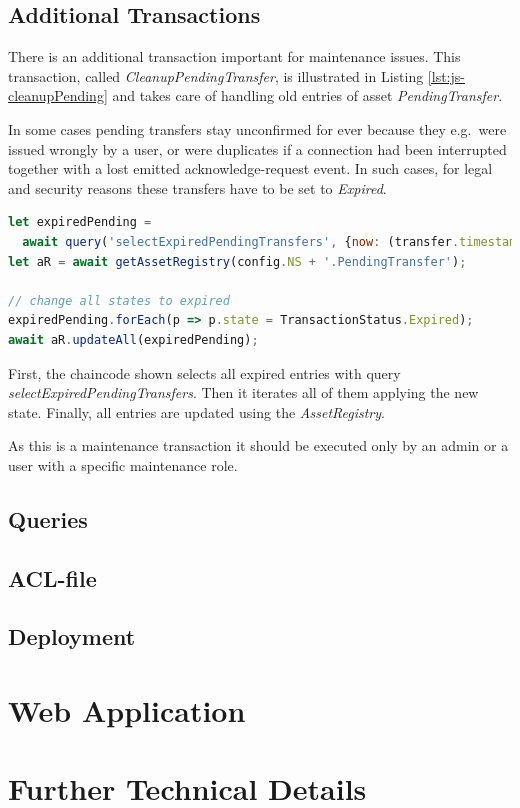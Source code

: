 \subsection{Additional Transactions}

There is an additional transaction important for maintenance issues. This transaction, called \textit{CleanupPendingTransfer}, is illustrated in Listing \ref{lst:js-cleanupPending} and takes care of handling old entries of asset \textit{PendingTransfer}.

In some cases pending transfers stay unconfirmed for ever because they e.g.\ were issued wrongly by a user, or were duplicates if a connection had been interrupted together with a lost emitted acknowledge-request event. In such cases, for legal and security reasons these transfers have to be set to \textit{Expired}.

\begin{center}
\begin{minipage}{0.8\textwidth}
\small
\begin{lstlisting}[language=javascript,firstnumber=1,caption={\bf\small clearDebt JavaScript excerpt}, captionpos=b,label=lst:js-cleanupPending]
let expiredPending =
  await query('selectExpiredPendingTransfers', {now: (transfer.timestamp)});
let aR = await getAssetRegistry(config.NS + '.PendingTransfer');

// change all states to expired
expiredPending.forEach(p => p.state = TransactionStatus.Expired);
await aR.updateAll(expiredPending);
\end{lstlisting}
\end{minipage}
\end{center}

First, the chaincode shown selects all expired entries with query \textit{selectExpiredPendingTransfers}. Then it iterates all of them applying the new state. Finally, all entries are updated using the \textit{AssetRegistry}.

As this is a maintenance transaction it should be executed only by an admin or a user with a specific maintenance role.

\subsection{Queries}
\label{subsec:queries}

\todo{}

\subsection{ACL-file}

\todo{}

\subsection{Deployment}

\todo{}


\section{Web Application}
\label{sec:webapp}


\section{Further Technical Details}
\label{sec:technical-details}

